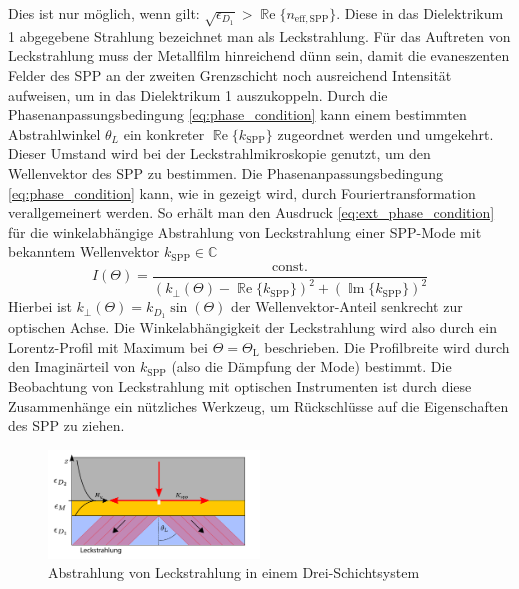 \documentclass[titlepage]{article}
\renewcommand{\Re}{\operatorname{\mathbb{R}e}}
\renewcommand{\Im}{\operatorname{\mathbb{I}m}}
\begin{document}
	Dies ist nur möglich, wenn gilt: {$\sqrt{\epsilon_{D_1}} > \Re\{n_\mathrm{eff, SPP}\}$}. Diese in das Dielektrikum 1 abgegebene Strahlung bezeichnet man als Leckstrahlung. Für das Auftreten von Leckstrahlung muss der Metallfilm hinreichend dünn sein, damit die evaneszenten Felder des  SPP an der zweiten Grenzschicht noch ausreichend Intensität aufweisen, um in das Dielektrikum 1 auszukoppeln. Durch die Phasenanpassungsbedingung \eqref{eq:phase_condition} kann einem bestimmten Abstrahlwinkel $\theta_L$ ein konkreter $\Re\{k_{\mathrm{SPP}}\}$ zugeordnet werden und umgekehrt. Dieser Umstand wird bei der Leckstrahlmikroskopie genutzt, um den Wellenvektor des SPP zu bestimmen.
	Die Phasenanpassungsbedingung \eqref{eq:phase_condition} kann, wie in \cite{Burke.1986} gezeigt wird, durch Fouriertransformation verallgemeinert werden. So erhält man den Ausdruck \eqref{eq:ext_phase_condition} für die winkelabhängige Abstrahlung von Leckstrahlung einer SPP-Mode mit bekanntem Wellenvektor $k_{\mathrm{SPP}} \in \mathbb{C}$
	\begin{equation}
		\label{eq:ext_phase_condition}
		I(\Theta) = \dfrac{\text{const.}}{\left(k_{\perp}(\Theta) - \Re\{k_{\mathrm{SPP}}\}\right)^2 + (\Im\{k_{\mathrm{SPP}}\})^2}
	\end{equation}
	Hierbei ist $k_{\perp}(\Theta) = k_{D_1}\sin(\Theta)$ der Wellenvektor-Anteil senkrecht zur optischen Achse. Die Winkelabhängigkeit der Leckstrahlung wird also durch ein Lorentz-Profil mit Maximum bei $\Theta = \Theta_\mathrm{L}$ beschrieben. Die Profilbreite wird durch den Imaginärteil von $k_{\mathrm{SPP}}$ (also die Dämpfung der Mode) bestimmt. Die Beobachtung von Leckstrahlung mit optischen Instrumenten ist durch diese Zusammenhänge ein nützliches Werkzeug, um Rückschlüsse auf die Eigenschaften des SPP zu ziehen.
	\begin{figure}[h] 
		\centering
		\includegraphics[width=0.5\textwidth]{figures/leckstrahlung.pdf}
		\caption[Leckstrahlung Drei-Schichtsystem]{Abstrahlung von Leckstrahlung in einem Drei-Schichtsystem}
		\label{fig:leakage_radiation}
	\end{figure}
\end{document}
